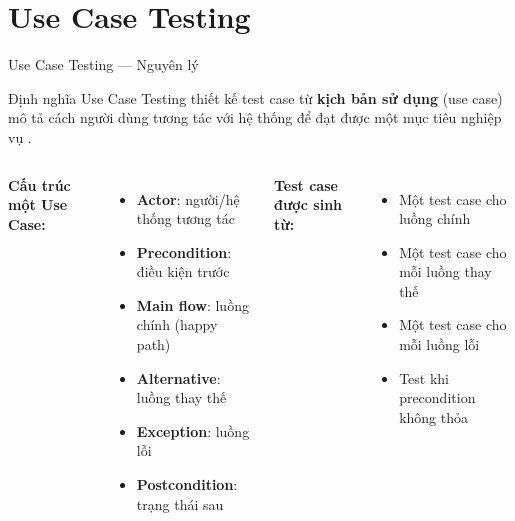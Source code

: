 \documentclass[aspectratio=169,12pt]{beamer}
\begin{document}
\section{Use Case Testing}

\begin{frame}[shrink=8]{Use Case Testing --- Nguyên lý}
  \begin{block}{Định nghĩa}
    Use Case Testing thiết kế test case từ \textbf{kịch bản sử dụng}
    (use case) mô tả cách người dùng tương tác với hệ thống
    để đạt được một mục tiêu nghiệp vụ \cite{istqb-ctfl,iso-29119}.
  \end{block}

  \vspace{0.15em}
  \small
  \begin{columns}[T,totalwidth=\textwidth]
    \textbf{Cấu trúc một Use Case:}
    \begin{itemize}
      \item \textbf{Actor}: người/hệ thống tương tác
      \item \textbf{Precondition}: điều kiện trước
      \item \textbf{Main flow}: luồng chính (happy path)
      \item \textbf{Alternative}: luồng thay thế
      \item \textbf{Exception}: luồng lỗi
      \item \textbf{Postcondition}: trạng thái sau
    \end{itemize}

    \textbf{Test case được sinh từ:}
    \begin{itemize}
      \item Một test case cho luồng chính
      \item Một test case cho mỗi luồng thay thế
      \item Một test case cho mỗi luồng lỗi
      \item Test khi precondition không thỏa
    \end{itemize}
  \end{columns}
\end{frame}
\end{document}

